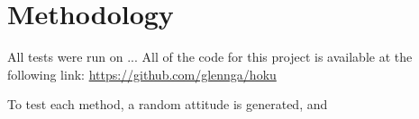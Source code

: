 \section{Methodology}
All tests were run on ...
All of the code for this project is available at the following link: 
\url{https://github.com/glennga/hoku}

To test each method, a random attitude is generated, and 

\subsection{}